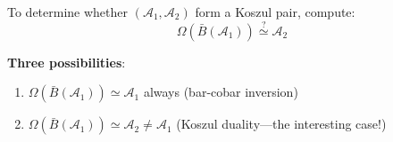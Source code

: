 \begin{remark}
\label{rem:diagnostic-koszul-test}
To determine whether $(\mathcal{A}_1, \mathcal{A}_2)$ form a Koszul pair, compute:
$$\Omega(\bar{B}(\mathcal{A}_1)) \stackrel{?}{\simeq} \mathcal{A}_2$$

\textbf{Three possibilities}:
\begin{enumerate}
\item $\Omega(\bar{B}(\mathcal{A}_1)) \simeq \mathcal{A}_1$ always (bar-cobar inversion)
\item $\Omega(\bar{B}(\mathcal{A}_1)) \simeq \mathcal{A}_2 \neq \mathcal{A}_1$ 
      (Koszul duality—the interesting case!)

\end{enumerate}
\end{remark}

